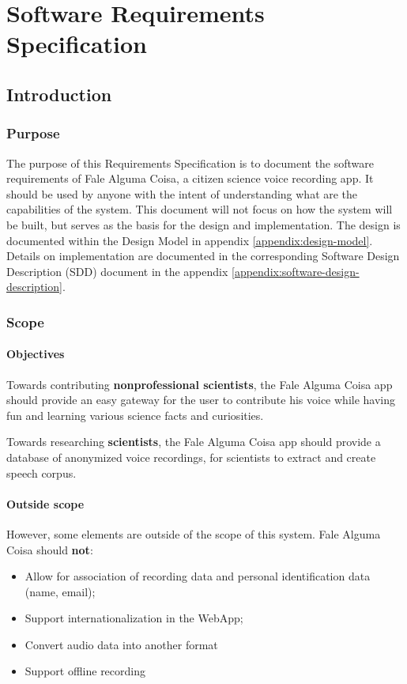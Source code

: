 \chapter{Software Requirements Specification}
\label{appendix:srs}

\section{Introduction}
\subsection{Purpose}

The purpose of this Requirements Specification is to document the software requirements of Fale Alguma Coisa, a citizen science voice recording app. It should be used by anyone with the intent of understanding what are the capabilities of the system. This document will not focus on how the system will be built, but serves as the basis for the design and implementation. The design is documented within the Design Model in appendix \ref{appendix:design-model}. Details on implementation are documented in the corresponding Software Design Description (SDD) document in the appendix \ref{appendix:software-design-description}.

\subsection{Scope}

\subsubsection{Objectives}

Towards contributing \textbf{nonprofessional scientists}, the Fale Alguma Coisa app should provide an easy gateway for the user to contribute his voice while having fun and learning various science facts and curiosities.

Towards researching \textbf{scientists}, the Fale Alguma Coisa app should provide a database of anonymized voice recordings, for scientists to extract and create speech corpus.

\subsubsection{Outside scope}

However, some elements are outside of the scope of this system. Fale Alguma Coisa should \textbf{not}:
\begin{itemize}
    \item Allow for association of recording data and personal identification data (name, email);
    \item Support internationalization in the WebApp;
    \item Convert audio data into another format
    \item Support offline recording
\end{itemize}

